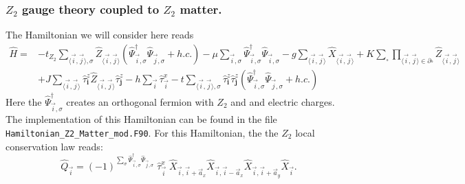 \subsubsection{$Z_2$ gauge theory coupled to $Z_2$ matter.   }
\label{Z2.Sec}
The Hamiltonian we will consider here reads
\begin{align}
	\hat{H} =& -  t_{Z_2} \sum_{\langle \vec{i}, \vec{j} \rangle, \sigma } \hat{Z}_{\langle \vec{i}, \vec{j} \rangle}
	\left(\hat{\Psi}^{\dagger}_{\vec{i},\sigma} \hat{\Psi}^{\phantom{\dagger}}_{\vec{j},\sigma}   + h.c. \right) - \mu \sum_{\vec{i},\sigma} \hat{\Psi}^{\dagger}_{\vec{i},\sigma} \hat{\Psi}^{\phantom{\dagger}}_{\vec{i},\sigma}  
	-g \sum_{\langle \vec{i}, \vec{j} \rangle } \hat{X}_{\langle \vec{i}, \vec{j} \rangle }  +
	  K \sum_{\square} \prod_{\langle \vec{i}, \vec{j} \rangle \in \partial \square} \hat{Z}_{\langle \vec{i}, \vec{j} \rangle}  \nonumber \\
	& + J  \sum_{\langle \vec{i}, \vec{j} \rangle}  \hat{\tau}^z_{\pmb{i}}  \hat{Z}_{\langle \vec{i}, \vec{j} \rangle} \hat{\tau}^z_{\pmb{j}}   
	      -  h \sum_{ \vec{i} } \hat{\tau}^x_{\vec{i}}   - t  \sum_{\langle \vec{i}, \vec{j} \rangle, \sigma }   \hat{\tau}^z_{\pmb{i}}   \hat{\tau}^z_{\pmb{j}}  \left( \hat{\Psi}^{\dagger}_{\vec{i},\sigma} \hat{\Psi}^{\phantom{\dagger}}_{\vec{j},\sigma} 	+ h.c. \right)
\end{align}  
Here the  $\hat{\Psi}^{\dagger}_{\vec{i},\sigma}$  creates an orthogonal fermion with $Z_2$ and  and electric charges.    
The implementation of this Hamiltonian can be found in the file \texttt{Hamiltonian\_Z2\_Matter\_mod.F90}.
 For this Hamiltonian, the the $Z_2$ local conservation law reads: 
\begin{equation}
	\hat{Q}_{\vec{i}} =  (-1)^{\sum_{\sigma} \hat{\Psi}^{\dagger}_{\vec{i},\sigma} \hat{\Psi}^{\phantom{\dagger}}_{\vec{j},\sigma}   } 
	\;  \hat{\tau}^{x}_{\vec{i}}  \; \hat{X}_{\vec{i},\vec{i} +  \vec{a}_x} \hat{X}_{\vec{i},\vec{i} -  \vec{a}_x} \hat{X}_{\vec{i},\vec{i} +  \vec{a}_y} \hat{X}_{\vec{i}}.
\end{equation} 

